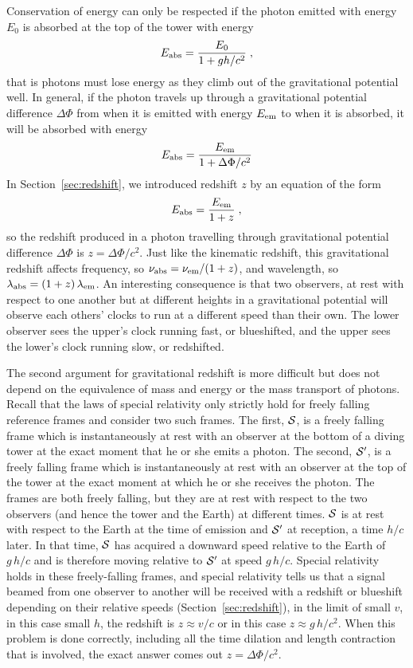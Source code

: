 Conservation of energy can only be respected if the photon emitted
with energy $E_0$ is absorbed at the top of the tower with energy
\begin{equation}
E_{\rm abs} = \frac{E_0}{1+gh/c^2} \;,
\end{equation}
that is photons must lose energy as they climb out of the
gravitational potential well.  In general, if the photon travels up
through a gravitational potential difference $\Delta\Phi$ from when it
is emitted with energy $E_{\rm em}$ to when it is absorbed, it will be
absorbed with energy
\begin{equation}
E_{\rm abs} = \frac{E_{\rm em}}{1+\Delta\Phi/c^2}
\end{equation}
In Section~\ref{sec:redshift}, we introduced redshift $z$ by an
equation of the form
\begin{equation}
E_{\rm abs} = \frac{E_{\rm em}}{1+z} \;,
\end{equation}
so the redshift produced in a photon travelling through gravitational
potential difference $\Delta\Phi$ is $z=\Delta\Phi/c^2$.  Just like
the kinematic redshift, this gravitational redshift affects frequency,
so $\nu_{\rm abs}=\nu_{\rm em}/(1+z)$, and wavelength, so
$\lambda_{\rm abs}=(1+z)\,\lambda_{\rm em}$.  An interesting
consequence is that two observers, at rest with respect to one another
but at different heights in a gravitational potential will observe
each others' clocks to run at a different speed than their own.  The
lower observer sees the upper's clock running fast, or blueshifted, and
the upper sees the lower's clock running slow, or redshifted.

The second argument for gravitational redshift is more difficult but
does not depend on the equivalence of mass and energy or the mass
transport of photons.  Recall that the laws of special relativity only
strictly hold for freely falling reference frames and consider two
such frames.  The first, $\cal S$, is a freely falling frame which is
instantaneously at rest with an observer at the bottom of a diving
tower at the exact moment that he or she emits a photon.  The second,
$\cal S'$, is a freely falling frame which is instantaneously at rest
with an observer at the top of the tower at the exact moment at which
he or she receives the photon.  The frames are both freely falling,
but they are at rest with respect to the two observers (and hence the
tower and the Earth) at different times.  $\cal S$ is at rest with
respect to the Earth at the time of emission and $\cal S'$ at
reception, a time $h/c$ later.  In that time, $\cal S$ has acquired a
downward speed relative to the Earth of $g\,h/c$ and is therefore
moving relative to $\cal S'$ at speed $g\,h/c$.  Special relativity
holds in these freely-falling frames, and special relativity tells us
that a signal beamed from one observer to another will be received
with a redshift or blueshift depending on their relative speeds
(Section~\ref{sec:redshift}), in the limit of small $v$, in this case
small $h$, the redshift is $z\approx v/c$ or in this case $z\approx
g\,h/c^2$.  When this problem is done correctly, including all the
time dilation and length contraction that is involved, the exact
answer comes out $z=\Delta\Phi/c^2$.

